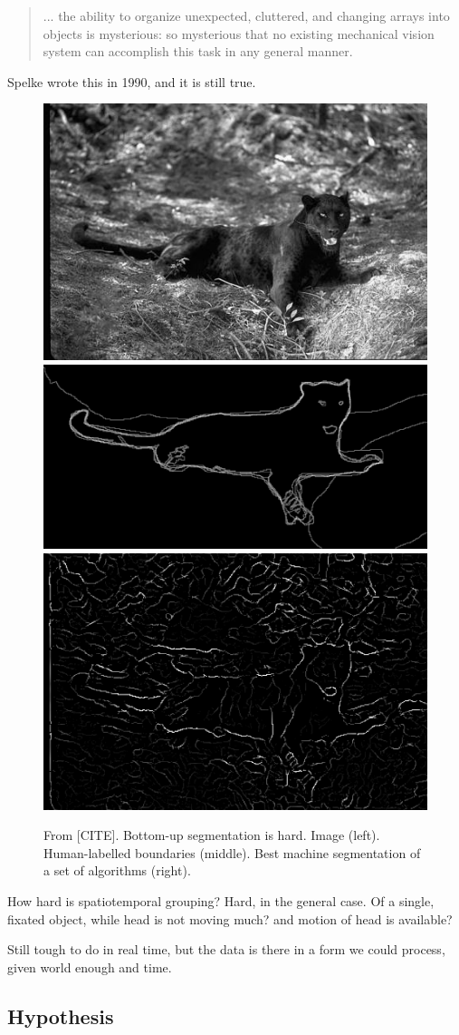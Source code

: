 \begin{quote}

... the ability to organize unexpected, cluttered, and
changing arrays into objects is mysterious: so mysterious
that no existing mechanical vision system can accomplish this task
in any general manner.

\end{quote}

Spelke wrote this in 1990, and it is still true.


\begin{figure}

\centerline{
\includegraphics[width=0.3\columnwidth]{cat}
\includegraphics[width=0.3\columnwidth]{cat-human}
\includegraphics[width=0.3\columnwidth]{cat-machine}
}

\caption{
From [CITE].  Bottom-up segmentation is hard.
Image (left).  Human-labelled boundaries (middle).
Best machine segmentation of a set of algorithms (right).
}

\end{figure}

\cite{martin01database}

How hard is spatiotemporal grouping?
Hard, in the general case.
Of a single, fixated object, while head is not moving much?  and
motion of head is available?

Still tough to do in real time, but the data is there in a form
we could process, given world enough and time.



\subsection{Hypothesis}

